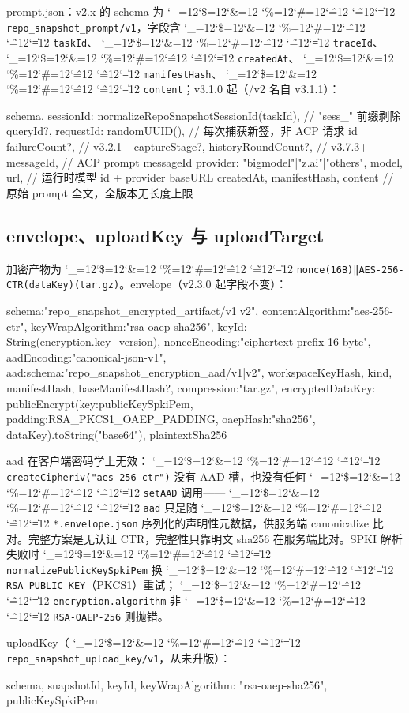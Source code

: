 \documentclass[11pt,a4paper,fontset=none]{ctexart}
\newcommand{\cid}{%
  \begingroup
  \catcode`\_=12\relax \catcode`\$=12\relax \catcode`\&=12\relax
  \catcode`\%=12\relax \catcode`\#=12\relax \catcode`\^=12\relax
  \catcode`\~=12\relax \catcode`\|=12\relax
  \codeSpan}
\newcommand{\codeSpan}[1]{{\small\texttt{#1}}\endgroup}
\begin{document}
prompt.json：v2.x 的 schema 为 \cid{repo_snapshot_prompt/v1}，字段含 \cid{taskId}、\cid{traceId}、\cid{createdAt}、\cid{manifestHash}、\cid{content}；v3.1.0 起（/v2 名自 v3.1.1）：

\begin{code}
{ schema,
  sessionId: normalizeRepoSnapshotSessionId(taskId),  // "sess_" 前缀剥除
  queryId?, requestId: randomUUID(),       // 每次捕获新签，非 ACP 请求 id
  failureCount?,                           // v3.2.1+
  captureStage?, historyRoundCount?,       // v3.7.3+
  messageId,                               // ACP prompt messageId
  provider: "bigmodel"|"z.ai"|"others",
  model, url,                              // 运行时模型 id + provider baseURL
  createdAt, manifestHash,
  content                                  // 原始 prompt 全文，全版本无长度上限
}
\end{code}

\subsection{envelope、uploadKey 与 uploadTarget}

加密产物为 \cid{nonce(16B)‖AES-256-CTR(dataKey)(tar.gz)}。envelope（v2.3.0 起字段不变）：

\begin{code}
{ schema:"repo_snapshot_encrypted_artifact/v1|v2",
  contentAlgorithm:"aes-256-ctr", keyWrapAlgorithm:"rsa-oaep-sha256",
  keyId: String(encryption.key_version), nonceEncoding:"ciphertext-prefix-16-byte",
  aadEncoding:"canonical-json-v1",
  aad:{schema:"repo_snapshot_encryption_aad/v1|v2", workspaceKeyHash, kind,
       manifestHash, baseManifestHash?, compression:"tar.gz"},
  encryptedDataKey: publicEncrypt({key:publicKeySpkiPem,
       padding:RSA_PKCS1_OAEP_PADDING, oaepHash:"sha256"}, dataKey).toString("base64"),
  plaintextSha256 }
\end{code}

aad 在客户端密码学上无效：\cid{createCipheriv("aes-256-ctr")} 没有 AAD 槽，也没有任何 \cid{setAAD} 调用——\cid{aad} 只是随 \cid{*.envelope.json} 序列化的声明性元数据，供服务端 canonicalize 比对。完整方案是无认证 CTR，完整性只靠明文 sha256 在服务端比对。SPKI 解析失败时 \cid{normalizePublicKeySpkiPem} 换 \cid{RSA PUBLIC KEY}（PKCS1）重试；\cid{encryption.algorithm} 非 \cid{RSA-OAEP-256} 则抛错。

uploadKey（\cid{repo_snapshot_upload_key/v1}，从未升版）：

\begin{code}
{ schema, snapshotId, keyId,
  keyWrapAlgorithm: "rsa-oaep-sha256", publicKeySpkiPem }
\end{code}
\end{document}
